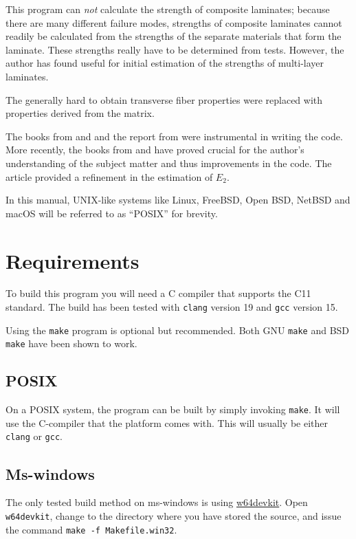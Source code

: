 \documentclass[a4paper,landscape,oneside,11pt,twocolumn]{memoir}
\begin{document}
This program can \emph{not} calculate the strength of composite laminates;
because there are many different failure modes, strengths of composite
laminates cannot readily be calculated from the strengths of the separate
materials that form the laminate. These strengths really have to be determined from
tests. However, the author has found \citet{1992WeiEn..52...29H} useful for
initial estimation of the strengths of multi-layer laminates.

The generally hard to obtain transverse fiber properties
were replaced with properties derived from the matrix.

The books from \citet{Hyer:1998} and \citet{Tsai:1992} and the report from
\citet{Nettles:1994} were instrumental in writing the code.
More recently, the books from \citet{Bower:2010} and
\citet{Barbero:2008,Barbero:2018} have proved crucial for the
author's understanding of the subject matter and thus improvements in the
code.
The article \citet{Giner:2014} provided a refinement in the estimation of
$E_2$.

In this manual, UNIX-like systems like Linux, FreeBSD, Open BSD, NetBSD and macOS will be
referred to as “POSIX” for brevity.


\chapter{Requirements} %

To build this program you will need a C compiler that supports the C11
standard.
The build has been tested with \texttt{clang} version 19 and \texttt{gcc}
version 15.

Using the \texttt{make} program is optional but recommended.
Both GNU \texttt{make} and BSD \texttt{make} have been shown to work.

\section{POSIX}

On a POSIX system, the program can be built by simply invoking \texttt{make}.
It will use the C-compiler that the platform comes with.
This will usually be either \texttt{clang} or \texttt{gcc}.

\section{Ms-windows}

The only tested build method on ms-windows is using
\href{https://github.com/skeeto/w64devkit}{w64devkit}.
Open \texttt{w64devkit}, change to the directory where you have stored the source,
and issue the command \texttt{make~-f~Makefile.win32}.
\end{document}
